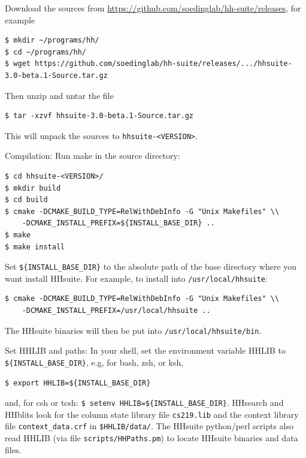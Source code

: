 \documentclass[11pt,a4paper]{article}
\begin{document}
\begin{enum}

\item Download the sources from \url{https://github.com/soedinglab/hh-suite/releases}, for example
\begin{verbatim}
$ mkdir ~/programs/hh/
$ cd ~/programs/hh/
$ wget https://github.com/soedinglab/hh-suite/releases/.../hhsuite-3.0-beta.1-Source.tar.gz 
\end{verbatim}
\vspace{2mm}


\item Then unzip and untar the file
\begin{verbatim}
$ tar -xzvf hhsuite-3.0-beta.1-Source.tar.gz
\end{verbatim}
This will unpack the sources to \verb`hhsuite-<VERSION>`.
\vspace{2mm}


\item Compilation: Run make in the source directory:
\begin{verbatim}
$ cd hhsuite-<VERSION>/
$ mkdir build
$ cd build
$ cmake -DCMAKE_BUILD_TYPE=RelWithDebInfo -G "Unix Makefiles" \\
    -DCMAKE_INSTALL_PREFIX=${INSTALL_BASE_DIR} ..
$ make
$ make install
\end{verbatim}

Set \verb`${INSTALL_BASE_DIR}` to the absolute path of the base directory where you want install HHsuite.
For example, to install into \verb`/usr/local/hhsuite`:
\begin{verbatim}
$ cmake -DCMAKE_BUILD_TYPE=RelWithDebInfo -G "Unix Makefiles" \\
    -DCMAKE_INSTALL_PREFIX=/usr/local/hhsuite ..
\end{verbatim}

The HHsuite binaries will then be put into \verb`/usr/local/hhsuite/bin`.

\vspace{2mm}

\item Set HHLIB and paths: In your shell, set the environment variable HHLIB to \verb`${INSTALL_BASE_DIR}`, 
e.g, for bash, zsh, or ksh,
\begin{verbatim}
$ export HHLIB=${INSTALL_BASE_DIR}
\end{verbatim}
and, for csh or tcsh: \verb`$ setenv HHLIB=${INSTALL_BASE_DIR}`. 
HHsearch and HHblits look for the column state library file \verb`cs219.lib`
and the context library file \verb`context_data.crf` in \verb`$HHLIB/data/`. The HHsuite
python/perl scripts also read HHLIB (via file \verb`scripts/HHPaths.pm`) to locate HHsuite binaries and data files.


\end{enum}
\end{document}
